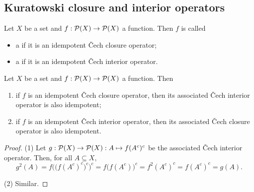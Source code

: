 \subsection{Kuratowski closure and interior operators}
\begin{definition}
Let $X$ be a set and $f: \operatorname{\mathcal{P}}(X)\to \operatorname{\mathcal{P}}(X)$ a function. Then $f$ is called
\begin{itemize}
\item a  if it is an idempotent Čech closure operator;
\item a  if it is an idempotent Čech interior operator.
\end{itemize}
\end{definition}

\begin{lemma}
Let $X$ be a set and $f: \operatorname{\mathcal{P}}(X)\to \operatorname{\mathcal{P}}(X)$ a function. Then
\begin{enumerate}
\item if $f$ is an idempotent Čech closure operator, then its associated Čech interior operator is also idempotent;
\item if $f$ is an idempotent Čech interior operator, then its associated Čech closure operator is also idempotent.
\end{enumerate}
\end{lemma}
\begin{proof}
(1) Let $g: \operatorname{\mathcal{P}}(X)\to \operatorname{\mathcal{P}}(X): A\mapsto f(A^c)^c$ be the associated Čech interior operator. Then, for all $A\subseteq X$,
\[ g^2(A) = f\Big(\big(f(A^c)^c\big)^c\Big)^c = f\Big(f(A^c)\Big)^c = f^2(A^c)^c = f(A^c)^c = g(A). \]

(2) Similar.
\end{proof}

